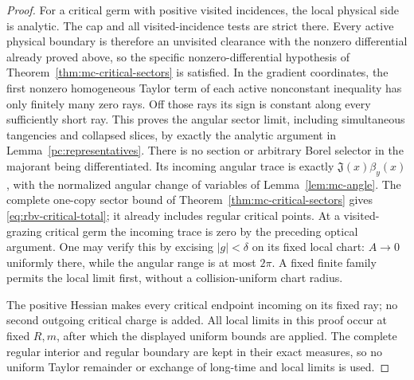 \begin{proof}
For a critical germ with positive visited incidences, the local
physical side is analytic.  The cap and all visited-incidence
tests are strict there.  Every active physical boundary is
therefore an unvisited clearance with the nonzero differential
already proved above, so the specific nonzero-differential
hypothesis of Theorem~\ref{thm:mc-critical-sectors} is satisfied.
In the gradient coordinates, the first
nonzero homogeneous Taylor term of each active nonconstant
inequality has only finitely many zero rays.  Off those rays its
sign is constant along every sufficiently short ray.  This proves
the angular sector limit, including simultaneous tangencies and
collapsed slices, by exactly the analytic argument in
Lemma~\ref{pc:representatives}.  There is no section or arbitrary
Borel selector in the majorant being differentiated.  Its incoming
angular trace is exactly $\mathfrak J(x)\beta_y(x)$, with the
normalized angular change of variables of
Lemma~\ref{lem:mc-angle}.  The complete one-copy sector bound of
Theorem~\ref{thm:mc-critical-sectors} gives
\eqref{eq:rbv-critical-total}; it already includes regular critical
points.  At a visited-grazing critical germ the incoming trace is
zero by the preceding optical argument.  One may verify this by
excising $|g|<\delta$ on its fixed local chart: $A\to0$ uniformly
there, while the angular range is at most $2\pi$.  A fixed finite
family permits the local limit first, without a collision-uniform
chart radius.

The positive Hessian makes every critical endpoint incoming on its
fixed ray; no second outgoing critical charge is added.  All local
limits in this proof occur at fixed $R,m$, after which the displayed
uniform bounds are applied.  The complete regular interior and
regular boundary are kept in their exact measures, so no uniform
Taylor remainder or exchange of long-time and local limits is used.
\end{proof}

